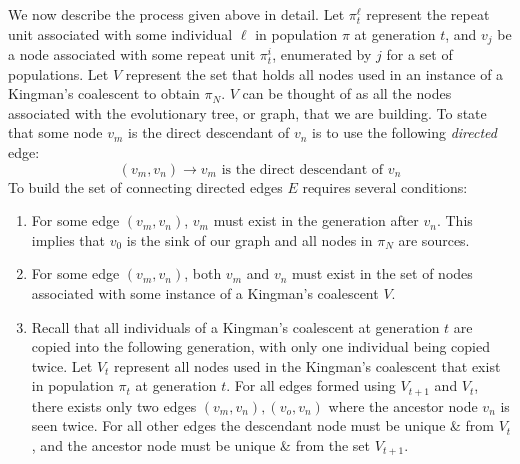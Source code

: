 We now describe the process given above in detail.
Let $\pi_t^{\ell}$ represent the repeat unit associated with some individual $\ell$ in population $\pi$ at
generation $t$,
and $v_j$ be a node associated with some repeat unit $\pi_t^i$, enumerated by $j$ for a set of populations.
%
Let $V$ represent the set that holds all nodes used in an instance of a Kingman's coalescent to obtain $\pi_N$.
$V$ can be thought of as all the nodes associated with the evolutionary tree, or graph, that we are building.
To state that some node $v_m$ is the direct descendant of $v_n$ is to use the following \emph{directed} edge:
\begin{equation}
    (v_m, v_n) \rightarrow v_m \text{ is the direct descendant of } v_n
\end{equation}
To build the set of connecting directed edges $E$ requires several conditions:
\begin{enumerate}
    \item For some edge $(v_m, v_n)$, $v_m$ must exist in the generation after $v_n$.
        This implies that $v_0$ is the sink of our graph and all nodes in $\pi_N$ are sources.
    \item For some edge $(v_m, v_n)$, both $v_m$ and $v_n$ must exist in the set of nodes associated with some instance
        of a Kingman's coalescent $V$.
    \item Recall that all individuals of a Kingman's coalescent at generation $t$ are copied into the following
        generation, with only one individual being copied twice.
        Let $V_t$ represent all nodes used in the Kingman's coalescent that exist in population $\pi_t$ at generation
        $t$.
        For all edges formed using $V_{t+1}$ and $V_{t}$, there exists only two edges $(v_m, v_n), (v_o, v_n)$ where
        the ancestor node $v_n$ is seen twice.
        For all other edges the descendant node must be unique \& from $V_t$, and the ancestor node must be unique \&
        from the set $V_{t+1}$.
\end{enumerate}

